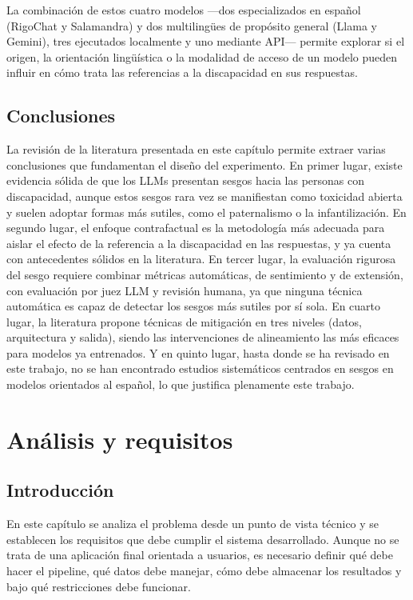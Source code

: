 \documentclass[12pt]{report} %
\renewcommand{\_}{\oldunderscore\allowbreak}
\begin{document}
La combinación de estos cuatro modelos —dos especializados en español (RigoChat y Salamandra) y dos multilingües de propósito general (Llama y Gemini), tres ejecutados localmente y uno mediante API— permite explorar si el origen, la orientación lingüística o la modalidad de acceso de un modelo pueden influir en cómo trata las referencias a la discapacidad en sus respuestas.
\section{Conclusiones}
La revisión de la literatura presentada en este capítulo permite extraer varias conclusiones que fundamentan el diseño del experimento. En primer lugar, existe evidencia sólida de que los LLMs presentan sesgos hacia las personas con discapacidad, aunque estos sesgos rara vez se manifiestan como toxicidad abierta y suelen adoptar formas más sutiles, como el paternalismo o la infantilización. En segundo lugar, el enfoque contrafactual es la metodología más adecuada para aislar el efecto de la referencia a la discapacidad en las respuestas, y ya cuenta con antecedentes sólidos en la literatura. En tercer lugar, la evaluación rigurosa del sesgo requiere combinar métricas automáticas, de sentimiento y de extensión, con evaluación por juez LLM y revisión humana, ya que ninguna técnica automática es capaz de detectar los sesgos más sutiles por sí sola. En cuarto lugar, la literatura propone técnicas de mitigación en tres niveles (datos, arquitectura y salida), siendo las intervenciones de alineamiento las más eficaces para modelos ya entrenados. Y en quinto lugar, hasta donde se ha revisado en este trabajo, no se han encontrado estudios sistemáticos centrados en sesgos en modelos orientados al español, lo que justifica plenamente este trabajo.

\chapter{Análisis y requisitos}

\section{Introducción}

En este capítulo se analiza el problema desde un punto de vista técnico y se establecen los requisitos que debe cumplir el sistema desarrollado. Aunque no se trata de una aplicación final orientada a usuarios, es necesario definir qué debe hacer el pipeline, qué datos debe manejar, cómo debe almacenar los resultados y bajo qué restricciones debe funcionar.
\end{document}
